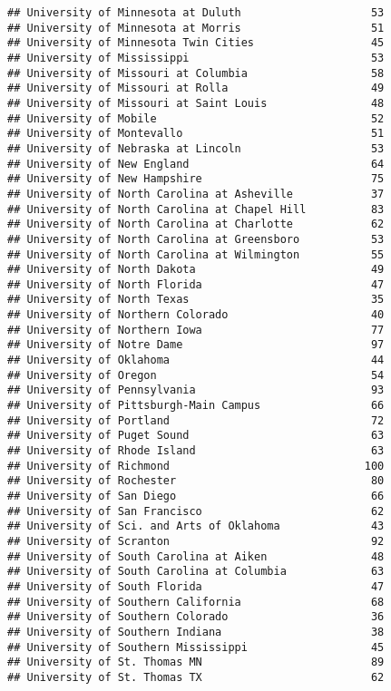 \documentclass[
]{article}
\begin{document}
\begin{verbatim}
## University of Minnesota at Duluth                    53
## University of Minnesota at Morris                    51
## University of Minnesota Twin Cities                  45
## University of Mississippi                            53
## University of Missouri at Columbia                   58
## University of Missouri at Rolla                      49
## University of Missouri at Saint Louis                48
## University of Mobile                                 52
## University of Montevallo                             51
## University of Nebraska at Lincoln                    53
## University of New England                            64
## University of New Hampshire                          75
## University of North Carolina at Asheville            37
## University of North Carolina at Chapel Hill          83
## University of North Carolina at Charlotte            62
## University of North Carolina at Greensboro           53
## University of North Carolina at Wilmington           55
## University of North Dakota                           49
## University of North Florida                          47
## University of North Texas                            35
## University of Northern Colorado                      40
## University of Northern Iowa                          77
## University of Notre Dame                             97
## University of Oklahoma                               44
## University of Oregon                                 54
## University of Pennsylvania                           93
## University of Pittsburgh-Main Campus                 66
## University of Portland                               72
## University of Puget Sound                            63
## University of Rhode Island                           63
## University of Richmond                              100
## University of Rochester                              80
## University of San Diego                              66
## University of San Francisco                          62
## University of Sci. and Arts of Oklahoma              43
## University of Scranton                               92
## University of South Carolina at Aiken                48
## University of South Carolina at Columbia             63
## University of South Florida                          47
## University of Southern California                    68
## University of Southern Colorado                      36
## University of Southern Indiana                       38
## University of Southern Mississippi                   45
## University of St. Thomas MN                          89
## University of St. Thomas TX                          62

\end{verbatim}
\end{document}
